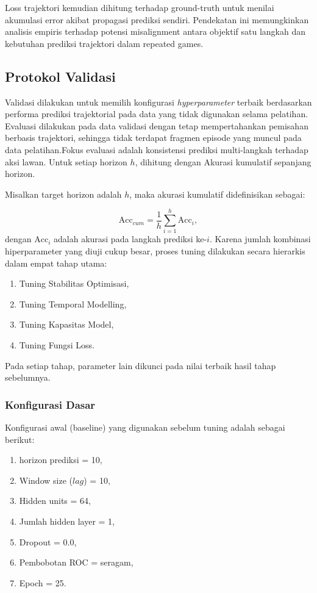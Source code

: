 Loss trajektori kemudian dihitung terhadap ground-truth untuk menilai akumulasi error akibat propagasi prediksi sendiri. Pendekatan ini memungkinkan analisis empiris terhadap potensi misalignment antara objektif satu langkah dan kebutuhan prediksi trajektori dalam repeated games.

\subsection{Protokol Validasi}

Validasi dilakukan untuk memilih konfigurasi \textit{hyperparameter} terbaik berdasarkan performa prediksi trajektorial pada data yang tidak digunakan selama pelatihan. Evaluasi dilakukan pada data validasi dengan tetap mempertahankan pemisahan berbasis trajektori, sehingga tidak terdapat fragmen episode yang muncul pada data pelatihan.Fokus evaluasi adalah konsistensi prediksi multi-langkah terhadap aksi lawan. Untuk setiap horizon $h$, dihitung dengan Akurasi kumulatif sepanjang horizon.

Misalkan target horizon adalah $h$, maka akurasi kumulatif didefinisikan sebagai:

\[
\text{Acc}_{cum} = 
\frac{1}{h}
\sum_{i=1}^{h}
\text{Acc}_i,
\]
\noindent
dengan $\text{Acc}_i$ adalah akurasi pada langkah prediksi ke-$i$.
\noindent
Karena jumlah kombinasi hiperparameter yang diuji cukup besar, proses tuning dilakukan secara hierarkis dalam empat tahap utama:

\begin{enumerate}
    \item Tuning Stabilitas Optimisasi,
    \item Tuning Temporal Modelling,
    \item Tuning Kapasitas Model,
    \item Tuning Fungsi Loss.
\end{enumerate}

Pada setiap tahap, parameter lain dikunci pada nilai terbaik hasil tahap sebelumnya.

\subsubsection{Konfigurasi Dasar}

Konfigurasi awal (baseline) yang digunakan sebelum tuning adalah sebagai berikut:

\begin{enumerate}
    \item horizon prediksi = 10,
    \item Window size ($lag$) = 10,
    \item Hidden units = 64,
    \item Jumlah hidden layer = 1,
    \item Dropout = 0.0,
    \item Pembobotan ROC = seragam,
    \item Epoch = 25.
\end{enumerate}

